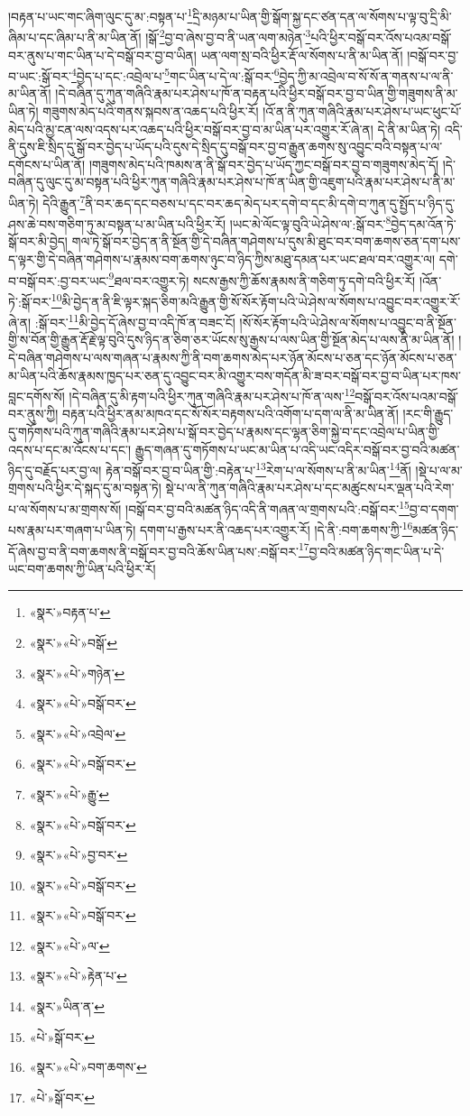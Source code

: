 །བརྟན་པ་ཡང་གང་ཞིག་ལུང་དུ་མ་:བསྟན་པ་\footnote{«སྣར་»བརྟན་པ་}དྲི་མཉམ་པ་ཡིན་གྱི་སྒོག་སྐྱ་དང་ཙན་དན་ལ་སོགས་པ་ལྟ་བུ་དྲི་མི་ཞིམ་པ་དང་ཞིམ་པ་ནི་མ་ཡིན་ནོ། །སྒོ་\footnote{«སྣར་»«པེ་»བསྒོ་}བྱ་བ་ཞེས་བྱ་བ་ནི་ཡན་ལག་མཉེན་\footnote{«སྣར་»«པེ་»གཉེན་}པའི་ཕྱིར་བསྒོ་བར་འོས་པའམ་བསྒོ་བར་ནུས་པ་གང་ཡིན་པ་དེ་བསྒོ་བར་བྱ་བ་ཡིན། ཡན་ལག་སྲ་བའི་ཕྱིར་རྡོ་ལ་སོགས་པ་ནི་མ་ཡིན་ནོ། །བསྒོ་བར་བྱ་བ་ཡང་:སྒོ་བར་\footnote{«སྣར་»«པེ་»བསྒོ་བར་}བྱེད་པ་དང་:འབྲེལ་པ་\footnote{«སྣར་»«པེ་»འབྲེལ་}གང་ཡིན་པ་དེ་ལ་:སྒོ་བར་\footnote{«སྣར་»«པེ་»བསྒོ་བར་}བྱེད་ཀྱི་མ་འབྲེལ་བ་སོ་སོ་ན་གནས་པ་ལ་ནི་མ་ཡིན་ནོ། །དེ་བཞིན་དུ་ཀུན་གཞིའི་རྣམ་པར་ཤེས་པ་ཁོ་ན་བརྟན་པའི་ཕྱིར་བསྒོ་བར་བྱ་བ་ཡིན་གྱི་གཟུགས་ནི་མ་ཡིན་ཏེ། གཟུགས་མེད་པའི་གནས་སྐབས་ན་འཆད་པའི་ཕྱིར་རོ། །འོ་ན་ནི་ཀུན་གཞིའི་རྣམ་པར་ཤེས་པ་ཡང་ཕུང་པོ་མེད་པའི་མྱ་ངན་ལས་འདས་པར་འཆད་པའི་ཕྱིར་བསྒོ་བར་བྱ་བ་མ་ཡིན་པར་འགྱུར་རོ་ཞེ་ན། དེ་ནི་མ་ཡིན་ཏེ། འདི་ནི་དུས་ཇི་སྲིད་དུ་སྒོ་བར་བྱེད་པ་ཡོད་པའི་དུས་དེ་སྲིད་དུ་བསྒོ་བར་བྱ་བ་རྒྱུན་ཆགས་སུ་འབྱུང་བའི་བསྟན་པ་ལ་དགོངས་པ་ཡིན་ནོ། །གཟུགས་མེད་པའི་ཁམས་ན་ནི་སྒོ་བར་བྱེད་པ་ཡོད་ཀྱང་བསྒོ་བར་བྱ་བ་གཟུགས་མེད་དོ། །དེ་བཞིན་དུ་ལུང་དུ་མ་བསྟན་པའི་ཕྱིར་ཀུན་གཞིའི་རྣམ་པར་ཤེས་པ་ཁོ་ན་ཡིན་གྱི་འཇུག་པའི་རྣམ་པར་ཤེས་པ་ནི་མ་ཡིན་ཏེ། དེའི་རྒྱུན་\footnote{«སྣར་»«པེ་»རྒྱུ་}ནི་བར་ཆད་དང་བཅས་པ་དང་བར་ཆད་མེད་པར་དགེ་བ་དང་མི་དགེ་བ་ཀུན་དུ་སྤྱོད་པ་ཉིད་དུ་ཤས་ཆེ་བས་གཅིག་ཏུ་མ་བསྟན་པ་མ་ཡིན་པའི་ཕྱིར་རོ། །ཡང་མེ་ལོང་ལྟ་བུའི་ཡེ་ཤེས་ལ་:སྒོ་བར་\footnote{«སྣར་»«པེ་»བསྒོ་བར་}བྱེད་དམ་འོན་ཏེ་སྒོ་བར་མི་བྱེད། གལ་ཏེ་སྒོ་བར་བྱེད་ན་ནི་སྔོན་གྱི་དེ་བཞིན་གཤེགས་པ་དུས་མི་ཐུང་བར་བག་ཆགས་ཅན་དག་པས་ད་ལྟར་གྱི་དེ་བཞིན་གཤེགས་པ་རྣམས་བག་ཆགས་ཉུང་བ་ཉིད་ཀྱིས་མཐུ་དམན་པར་ཡང་ཐལ་བར་འགྱུར་ལ། དགེ་བ་བསྒོ་བར་:བྱ་བར་ཡང་\footnote{«སྣར་»«པེ་»བྱ་བར་}ཐལ་བར་འགྱུར་ཏེ། སངས་རྒྱས་ཀྱི་ཆོས་རྣམས་ནི་གཅིག་ཏུ་དགེ་བའི་ཕྱིར་རོ། །འོན་ཏེ་:སྒོ་བར་\footnote{«སྣར་»«པེ་»བསྒོ་བར་}མི་བྱེད་ན་ནི་ཇི་ལྟར་སྐད་ཅིག་མའི་རྒྱུན་གྱི་སོ་སོར་རྟོག་པའི་ཡེ་ཤེས་ལ་སོགས་པ་འབྱུང་བར་འགྱུར་རོ་ཞེ་ན། :སྒོ་བར་\footnote{«སྣར་»«པེ་»བསྒོ་བར་}མི་བྱེད་དོ་ཞེས་བྱ་བ་འདི་ཁོ་ན་བཟང་ངོ། །སོ་སོར་རྟོག་པའི་ཡེ་ཤེས་ལ་སོགས་པ་འབྱུང་བ་ནི་སྔོན་གྱི་ས་བོན་གྱི་རྒྱུན་རྡོ་རྗེ་ལྟ་བུའི་དུས་ཉིད་ན་ཅིག་ཅར་ཡོངས་སུ་རྒྱས་པ་ལས་ཡིན་གྱི་སྔོན་མེད་པ་ལས་ནི་མ་ཡིན་ནོ། །དེ་བཞིན་གཤེགས་པ་ལས་གཞན་པ་རྣམས་ཀྱི་ནི་བག་ཆགས་མེད་པར་ཉོན་མོངས་པ་ཅན་དང་ཉོན་མོངས་པ་ཅན་མ་ཡིན་པའི་ཆོས་རྣམས་ཁྱད་པར་ཅན་དུ་འབྱུང་བར་མི་འགྱུར་བས་གདོན་མི་ཟ་བར་བསྒོ་བར་བྱ་བ་ཡིན་པར་ཁས་བླང་དགོས་སོ། །དེ་བཞིན་དུ་མི་རྟག་པའི་ཕྱིར་ཀུན་གཞིའི་རྣམ་པར་ཤེས་པ་ཁོ་ན་ལས་\footnote{«སྣར་»«པེ་»ལ་}བསྒོ་བར་འོས་པའམ་བསྒོ་བར་ནུས་ཀྱི། བརྟན་པའི་ཕྱིར་ནམ་མཁའ་དང་སོ་སོར་བརྟགས་པའི་འགོག་པ་དག་ལ་ནི་མ་ཡིན་ནོ། །རང་གི་རྒྱུད་དུ་གཏོགས་པའི་ཀུན་གཞིའི་རྣམ་པར་ཤེས་པ་སྒོ་བར་བྱེད་པ་རྣམས་དང་ལྷན་ཅིག་སྐྱེ་བ་དང་འབྲེལ་པ་ཡིན་གྱི་འདས་པ་དང་མ་འོངས་པ་དང་། རྒྱུད་གཞན་དུ་གཏོགས་པ་ཡང་མ་ཡིན་པ་འདི་ཡང་འདིར་བསྒོ་བར་བྱ་བའི་མཚན་ཉིད་དུ་བརྗོད་པར་བྱ་ལ། རྟེན་བསྒོ་བར་བྱ་བ་ཡིན་གྱི་:བརྟེན་པ་\footnote{«སྣར་»«པེ་»རྟེན་པ་}རེག་པ་ལ་སོགས་པ་ནི་མ་ཡིན་\footnote{«སྣར་»ཡིན་ན་}ནོ། །སྡེ་པ་ལ་མ་གྲགས་པའི་ཕྱིར་དེ་སྐད་དུ་མ་བསྟན་ཏེ། སྡེ་པ་ལ་ནི་ཀུན་གཞིའི་རྣམ་པར་ཤེས་པ་དང་མཚུངས་པར་ལྡན་པའི་རེག་པ་ལ་སོགས་པ་མ་གྲགས་སོ། །བསྒོ་བར་བྱ་བའི་མཚན་ཉིད་འདི་ནི་གཞན་ལ་གྲགས་པའི་:བསྒོ་བར་\footnote{«པེ་»སྒོ་བར་}བྱ་བ་དགག་པས་རྣམ་པར་གཞག་པ་ཡིན་ཏེ། དགག་པ་རྒྱས་པར་ནི་འཆད་པར་འགྱུར་རོ། །དེ་ནི་:བག་ཆགས་ཀྱི་\footnote{«སྣར་»«པེ་»བག་ཆགས་}མཚན་ཉིད་དོ་ཞེས་བྱ་བ་ནི་བག་ཆགས་ནི་བསྒོ་བར་བྱ་བའི་ཆོས་ཡིན་པས་:བསྒོ་བར་\footnote{«པེ་»སྒོ་བར་}བྱ་བའི་མཚན་ཉིད་གང་ཡིན་པ་དེ་ཡང་བག་ཆགས་ཀྱི་ཡིན་པའི་ཕྱིར་རོ། 